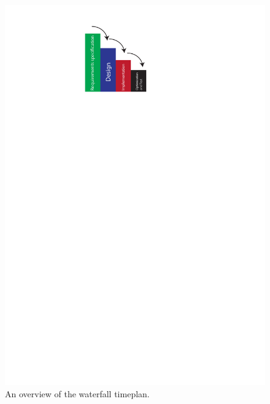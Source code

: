 \begin{figure}[h]
  \centering
  \includegraphics[scale=0.6]{Figures/Waterfall}
  \caption{An overview of the waterfall timeplan.}
\label{fig:Waterfall}
\end{figure}

